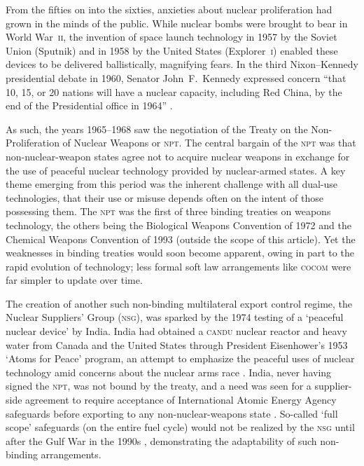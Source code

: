 \documentclass[preprint,twocolumn,5p]{elsarticle}
\begin{document}
From the fifties on into the sixties, anxieties about nuclear proliferation had grown in the minds of the public. While nuclear bombs were brought to bear in World War~\textsc{ii}, the invention of space launch technology in 1957 by the Soviet Union (Sputnik) and in 1958 by the United States (Explorer~\textsc{i}) enabled these devices to be delivered ballistically, magnifying fears. In the third Nixon--Kennedy presidential debate in 1960, Senator John~F.~Kennedy expressed concern ``that 10, 15, or 20 nations will have a nuclear capacity, including Red China, by the end of the Presidential office in 1964'' \citep{NixonKennedy3rd1960}.

As such, the years 1965--1968 saw the negotiation of the Treaty on the Non-Proliferation of Nuclear Weapons or \textsc{npt}. The central bargain of the \textsc{npt} was that non-nuclear-weapon states agree not to acquire nuclear weapons in exchange for the use of peaceful nuclear technology provided by nuclear-armed states. A key theme emerging from this period was the inherent challenge with all dual-use technologies, that their use or misuse depends often on the intent of those possessing them. The \textsc{npt} was the first of three binding treaties on weapons technology, the others being the Biological Weapons Convention of 1972 and the Chemical Weapons Convention of 1993 \citep{Beck2019} (outside the scope of this article). Yet the weaknesses in binding treaties would soon become apparent, owing in part to the rapid evolution of technology; less formal soft law arrangements like \textsc{cocom} were far simpler to update over time.


The creation of another such non-binding multilateral export control regime, the Nuclear Suppliers' Group (\textsc{nsg}), was sparked by the 1974 testing of a `peaceful nuclear device' by India. India had obtained a \textsc{candu} nuclear reactor and heavy water from Canada and the United States through President Eisenhower's 1953 `Atoms for Peace' program, an attempt to emphasize the peaceful uses of nuclear technology amid concerns about the nuclear arms race \citep{Walker2001}. India, never having signed the \textsc{npt}, was not bound by the treaty, and a need was seen for a supplier-side agreement to require acceptance of International Atomic Energy Agency safeguards before exporting to any non-nuclear-weapons state \citep{Burr2014}. So-called `full scope' safeguards (on the entire fuel cycle) would not be realized by the \textsc{nsg} until after the Gulf War in the 1990s \citep{Anthony2007}, demonstrating the adaptability of such non-binding arrangements.
\end{document}
